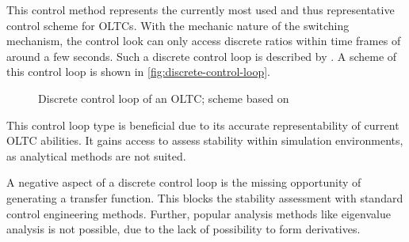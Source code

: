 This control method represents the currently most used and thus representative control scheme for \acsp{OLTC}. 
With the mechanic nature of the switching mechanism, the control look can only access discrete ratios within time frames of around a few seconds. 
Such a discrete control loop is described by \textcite{milano_2011,milano_2010}. 
A scheme of this control loop is shown in \autoref{fig:discrete-control-loop}.

\begin{figure}[htb!]
        \centering
        \caption{Discrete control loop of an \acs{OLTC}; scheme based on \textcite{milano_2011}}
        \label{fig:discrete-control-loop}
\end{figure}

This control loop type is beneficial due to its accurate representability of current \acs{OLTC} abilities. 
It gains access to assess stability within simulation environments, as analytical methods are not suited.

A negative aspect of a discrete control loop is the missing opportunity of generating a transfer function. 
This blocks the stability assessment with standard control engineering methods. 
Further, popular analysis methods like eigenvalue analysis is not possible, due to the lack of possibility to form derivatives.

% 


